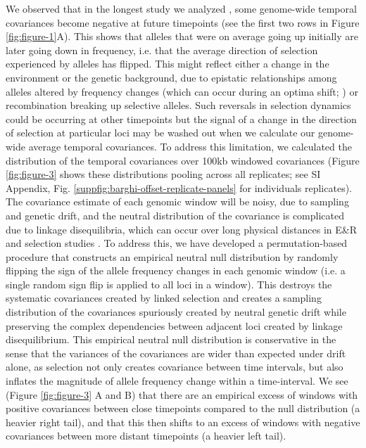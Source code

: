 \documentclass[9pt,twocolumn,twoside]{pnas-new}
\begin{document}
We observed that in the longest study  we analyzed \cite{Barghi2019-qy},
some genome-wide temporal covariances become negative at future timepoints (see
the first two rows in Figure \ref{fig:figure-1}A). This shows that alleles that
were on average going up initially are later going down in frequency, i.e.
that the average direction of selection experienced by alleles has flipped.
This might reflect either a change in the environment or the genetic
background, due to epistatic relationships among alleles altered by frequency
changes (which can occur during an optima shift; \cite{Hayward2019-kt}) or
recombination breaking up selective alleles. Such reversals in selection
dynamics could be occurring at other timepoints but the signal of a change in
the direction of selection at particular loci may be washed out when we
calculate our genome-wide average temporal covariances.  To address this
limitation, we calculated the distribution of the temporal covariances over
100kb windowed covariances (Figure \ref{fig:figure-3} shows these distributions
pooling across all replicates; see SI Appendix, Fig.
\ref{suppfig:barghi-offset-replicate-panels} for individuals replicates). The
covariance estimate of each genomic window will be noisy, due to sampling and
genetic drift, and the neutral distribution of the covariance is complicated
due to linkage disequilibria, which can occur over long physical distances in
E\&R and selection studies \cite{Nuzhdin2013-gf,Baldwin-Brown2014-cl}.  To
address this, we have developed a permutation-based procedure that constructs
an empirical neutral null distribution by randomly flipping the sign of
the allele frequency changes in each genomic window (i.e. a single random sign
flip is applied to all loci in a window). This destroys the systematic
covariances created by linked selection and creates a sampling distribution of
the covariances spuriously created by neutral genetic drift while preserving
the complex dependencies between adjacent loci created by linkage
disequilibrium.  This empirical neutral null distribution is conservative in
the sense that the variances of the covariances are wider than expected under
drift alone, as selection not only creates covariance between time
intervals, but also inflates the magnitude of allele frequency change within a
time-interval.  We see (Figure \ref{fig:figure-3} A and B) that there are an
empirical excess of windows with positive covariances between close timepoints
compared to the null distribution (a heavier right tail), and that this then
shifts to an excess of windows with negative covariances between more distant
timepoints (a heavier left tail).
\end{document}
